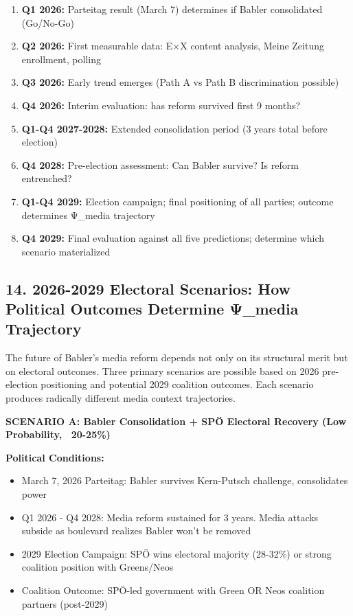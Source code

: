 \begin{enumerate}
\item \textbf{Q1 2026:} Parteitag result (March 7) determines if Babler consolidated (Go/No-Go)
\item \textbf{Q2 2026:} First measurable data: E×X content analysis, Meine Zeitung enrollment, polling
\item \textbf{Q3 2026:} Early trend emerges (Path A vs Path B discrimination possible)
\item \textbf{Q4 2026:} Interim evaluation: has reform survived first 9 months?
\item \textbf{Q1-Q4 2027-2028:} Extended consolidation period (3 years total before election)
\item \textbf{Q4 2028:} Pre-election assessment: Can Babler survive? Is reform entrenched?
\item \textbf{Q1-Q4 2029:} Election campaign; final positioning of all parties; outcome determines Ψ_media trajectory
\item \textbf{Q4 2029:} Final evaluation against all five predictions; determine which scenario materialized

\end{enumerate}

\label{sec:dx-election-scenarios}

\subsection*{14. 2026-2029 Electoral Scenarios: How Political Outcomes Determine Ψ_media Trajectory}

The future of Babler's media reform depends not only on its structural merit but on electoral outcomes.
Three primary scenarios are possible based on 2026 pre-election positioning and potential 2029 coalition
outcomes. Each scenario produces radically different media context trajectories.

\textbf{SCENARIO A: Babler Consolidation + SPÖ Electoral Recovery (Low Probability, ~20-25\%)}

\textbf{Political Conditions:}
\begin{itemize}
\item March 7, 2026 Parteitag: Babler survives Kern-Putsch challenge, consolidates power
\item Q1 2026 - Q4 2028: Media reform sustained for 3 years. Media attacks subside as boulevard realizes Babler won't be removed
\item 2029 Election Campaign: SPÖ wins electoral majority (28-32\%) or strong coalition position with Greens/Neos
\item Coalition Outcome: SPÖ-led government with Green OR Neos coalition partners (post-2029)
\end{itemize}

